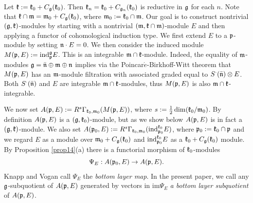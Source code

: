 \documentclass[12pt]{article}
\newcounter{theorem}
\newcommand{\refprop}[1]{Proposition \ref{#1}}
\begin{document}

Let $\frak k := \frak k_0 + C_{\frak g} (\frak k_0)$.  Then $\frak k_n = \frak k_0 + C_{\frak g_{n}} (\frak k_0)$ is reductive in $\frak g$ for each $n$.  Note that $\frak k\cap\frak m = \frak m_0 + C_{\frak g} (\frak k_0)$, where $\frak m_0 := \frak k_0\cap\frak m$. Our goal is to construct nontrivial $(\frak g,\frak k)$-modules by starting with a nontrivial $(\frak m, \frak k\cap\frak m)$-module $E$ and then applying a functor of cohomological induction type. We first extend $E$ to a $\frak p$-module by setting $\frak n \cdot E = 0$. We then consider the induced module $M(\frak p, E) := \text{ind}^{\frak g}_{\frak p} E$.  This is an integrable $\frak m\cap\frak k$-module.  Indeed, the equality of $\frak m$-modules $\frak g = \bar{\frak n} \oplus \frak m\oplus\frak n$ implies via the Poincar$\acute{e}$-Birkhoff-Witt theorem that $M(\frak p, E)$ has an $\frak m$-module filtration with associated graded equal to $S^\cdot (\bar{\frak n})\otimes E$.  Both $S^\cdot(\bar{\frak n})$ and $E$ are integrable $\frak m\cap\frak k$-modules, thus $M(\frak p, E)$ is also $\frak m\cap\frak k$-integrable.

We now set $A(\frak p, E) := R^s \Gamma_{\frak k_{0},\frak m_{0}} (M(\frak p, E))$, where $s := \frac{1}{2} \dim (\frak k_0/\frak m_0)$.  By definition $A(\frak p, E)$ is a $(\frak g,\frak k_0)$-module, but as we show below $A(\frak p,E)$ is in fact a $(\frak g, \frak k)$-module.  We also set $A(\frak p_0, E):= R^s \Gamma_{\frak k_{0},\frak m_{0}} (\text{ind}^{\frak k_{0}}_{\frak p_{0}} E)$, where $\frak p_0 := \frak k_0\cap\frak p$ and we regard $E$ as a module over $\frak m_0 + C_{\frak g}(\frak k_0)$ and $\text{ind}^{\frak k_{0}}_{\frak p_{0}} E$ as a $\frak k_0 + C_{\frak g} (\frak k_0)$ module. By \refprop{prop14}(a) there is a functorial morphism of $\frak k_0$-modules
$$
\Psi_E: A(\frak p_0, E)\to A(\frak p, E).
$$
Knapp and Vogan \cite{KV} call $\Psi_E$ the {\it bottom layer map}. In the present paper, we call any $\frak g$-subquotient of $A(\frak p,E)$ generated by vectors in $\text{im} \Psi_E$ {\it a bottom layer subquotient} of $A(\frak p,E)$.
\end{document}
